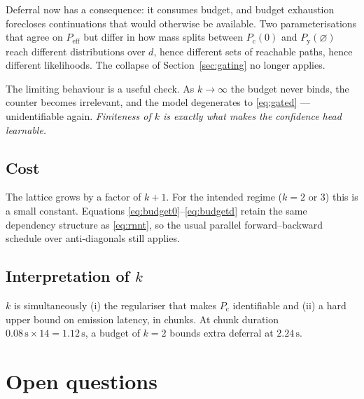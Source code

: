 \documentclass[11pt]{article}
\newcommand{\blank}{\varnothing}
\newcommand{\Py}{P_{\mathrm{y}}}
\newcommand{\Pc}{P_{\mathrm{c}}}
\newcommand{\Peff}{P_{\mathrm{eff}}}
\begin{document}
Deferral now has a consequence: it consumes budget, and budget exhaustion
forecloses continuations that would otherwise be available. Two parameterisations
that agree on $\Peff$ but differ in how mass splits between $\Pc(0)$ and
$\Py(\blank)$ reach different distributions over $d$, hence different sets of
reachable paths, hence different likelihoods. The collapse of
Section~\ref{sec:gating} no longer applies.

The limiting behaviour is a useful check. As $k \to \infty$ the budget never
binds, the counter becomes irrelevant, and the model degenerates to
\eqref{eq:gated} --- unidentifiable again. \emph{Finiteness of $k$ is exactly what
makes the confidence head learnable.}

\subsection{Cost}

The lattice grows by a factor of $k+1$. For the intended regime ($k = 2$ or $3$)
this is a small constant. Equations \eqref{eq:budget0}--\eqref{eq:budgetd} retain
the same dependency structure as \eqref{eq:rnnt}, so the usual parallel
forward--backward schedule over anti-diagonals still applies.

\subsection{Interpretation of $k$}

$k$ is simultaneously (i) the regulariser that makes $\Pc$ identifiable and
(ii) a hard upper bound on emission latency, in chunks. At chunk duration
$0.08\,\mathrm{s} \times 14 = 1.12\,\mathrm{s}$, a budget of $k=2$ bounds extra
deferral at $2.24\,\mathrm{s}$.

\section{Open questions}
\end{document}
